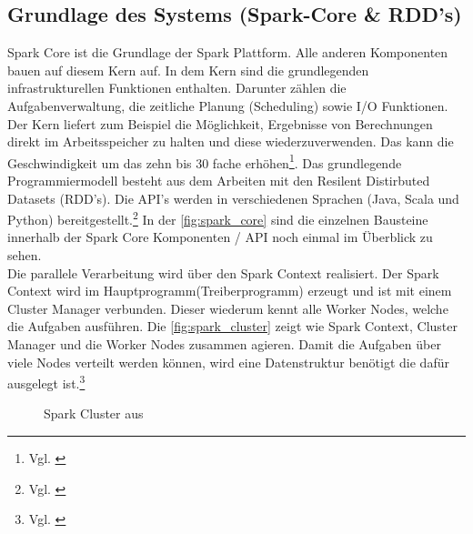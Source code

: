 \subsection{Grundlage des Systems (Spark-Core \& RDD’s)}\label{sec_sparkcore}
Spark Core ist die Grundlage der Spark Plattform. Alle anderen Komponenten bauen auf diesem Kern auf. In dem Kern sind die grundlegenden infrastrukturellen Funktionen enthalten. Darunter zählen die Aufgabenverwaltung, die zeitliche Planung (Scheduling) sowie I/O Funktionen.
Der Kern liefert zum Beispiel die Möglichkeit, Ergebnisse von Berechnungen direkt im Arbeitsspeicher zu halten und diese wiederzuverwenden. Das kann die Geschwindigkeit um das zehn bis 30 fache erhöhen\footnote{Vgl. \cite{VYL+16}}. 
Das grundlegende Programmiermodell besteht aus dem Arbeiten mit den Resilent Distirbuted Datasets (RDD's). Die API's werden in verschiedenen Sprachen (Java, Scala und Python) bereitgestellt.\footnote{Vgl. \cite{DATABRICK_ABOUT}} In der \autoref{fig:spark_core} sind die einzelnen Bausteine innerhalb der Spark Core Komponenten / API noch einmal im Überblick zu sehen. \\
 

\noindent
Die parallele Verarbeitung wird über den Spark Context realisiert. Der Spark Context wird im Hauptprogramm(Treiberprogramm) erzeugt und ist mit einem Cluster Manager verbunden. Dieser wiederum kennt alle Worker Nodes, welche die Aufgaben ausführen. Die \autoref{fig:spark_cluster} zeigt wie Spark Context, Cluster Manager und die Worker Nodes zusammen agieren. Damit die Aufgaben über viele Nodes verteilt werden können, wird eine Datenstruktur benötigt die dafür ausgelegt ist.\footnote{Vgl. \cite[101]{BDS16}}

\begin{figure}[h]
  \centering
  \caption{Spark Cluster aus \cite{SPCLUSTER}}\label{fig:spark_cluster}
\end{figure}



